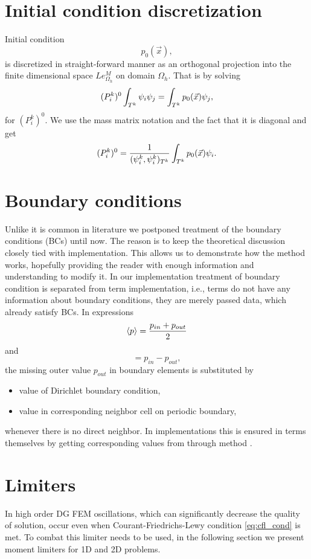 \section{Initial condition discretization}
Initial condition 
$$
p_0(\vec{x}),
$$
is discretized in straight-forward manner as an orthogonal projection into the 
finite dimensional space $Le_{\Omega_h}^{M}$ on domain $\Omega_h$. That is
by solving
\begin{equation}
\label{eq:init_proj}
(P^k_i)^0\int_{T^k}\psi_i\psi_j = \int_{T^k} p_0(\vec{x})\psi_j,
\end{equation}
for $(P^k_i)^0$. We use the mass matrix notation and the fact that 
it is diagonal and get
\begin{equation}
(P^k_i)^0 = \frac{1}{(\psi^k_i,\psi^k_i)_{T^k}}\int_{T^k} p_0(\vec{x})\psi_i.
\end{equation}

\section{Boundary conditions}
Unlike it is common in literature we postponed treatment of the boundary conditions (BCs) 
until now. The reason is to keep the theoretical discussion 
closely tied with implementation. This allows us to demonstrate how the method works, 
hopefully providing the reader with enough information and understanding to modify it. In 
our implementation treatment of boundary condition is separated from term implementation, 
i.e., terms do not have any information about boundary conditions, they are merely passed 
data, which already satisfy BCs.
In expressions
\begin{equation}
\langle p\rangle = \frac{p_{in} + p_{out}}{2}
\end{equation}
and 
\begin{equation}
[p] = p_{in} - p_{out},
\end{equation}
the missing outer value $p_{out}$ in boundary elements is substituted by
\begin{itemize}
    \item value of Dirichlet boundary condition, 
    \item value in corresponding neighbor cell on periodic boundary,
\end{itemize} 
whenever there is no direct neighbor.
In implementations this is ensured in terms themselves by getting corresponding values 
from  through method .

\newpage
\section{Limiters}
\label{se:limiters}
In high order DG FEM oscillations, which can significantly decrease the quality of 
solution, occur even when Courant-Friedrichs-Lewy condition \eqref{eq:cfl_cond} is met. 
To combat this limiter needs to be used, in the following section we present moment 
limiters for 1D and 
2D problems.

